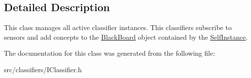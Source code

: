 \subsection{Detailed Description}
This class manages all active classifier instances. This classifiers subscribe to sensors and add concepts to the \hyperlink{class_black_board}{Black\+Board} object contained by the \hyperlink{class_self_instance}{Self\+Instance}. 

The documentation for this class was generated from the following file\+:\begin{DoxyCompactItemize}
\item 
src/classifiers/I\+Classifier.\+h\end{DoxyCompactItemize}
